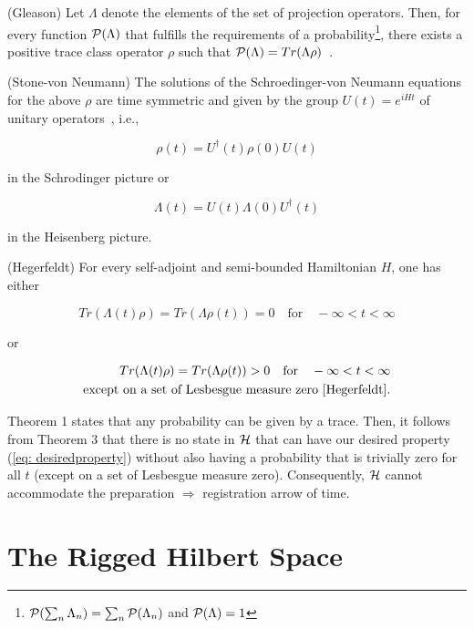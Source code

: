 \documentclass[12pt]{article}
\begin{document}
 (Gleason) Let $\Lambda$ denote the elements of the set of projection operators.  Then, for every function ${\cal P}(\Lambda)$ that fulfills the requirements of a probability\footnote{${\cal P}(\sum_n \Lambda_n) = \sum_n {\cal P}(\Lambda_n)$ and ${\cal P}(\Lambda) = 1$}, there exists a positive trace class operator $\rho$ such that ${\cal P}(\Lambda) = Tr(\Lambda \rho)$~\cite{Gleason}.

 (Stone-von Neumann) The solutions of the Schroedinger-von Neumann equations for the above $\rho$ are time symmetric and given by the group $U(t) = e^{iHt}$ of unitary operators~\cite{Stone-von.Neumann}, i.e., 

\begin{equation}
\rho(t) = U^{\dagger}(t) \rho(0) U(t)
\end{equation}

\noindent in the Schrodinger picture or

\begin{equation}
\Lambda(t) = U(t) \Lambda(0) U^{\dagger}(t)
\end{equation}

\noindent in the Heisenberg picture.

 (Hegerfeldt) For every self-adjoint and semi-bounded Hamiltonian $H$, one has either

\begin{equation}
Tr(\Lambda(t) \rho) = Tr(\Lambda \rho(t)) = 0 \,\,\,\,\,\, \mbox{for} \,\,\,\,\,\, -\infty < t < \infty
\end{equation}

\noindent or

\begin{eqnarray}
Tr(\Lambda(t) \rho) = Tr(\Lambda \rho(t)) > 0 \,\,\,\,\,\, \mbox{for} \,\,\,\,\,\, -\infty < t < \infty   \nonumber  \\
	 \mbox{except on a set of Lesbesgue measure zero~\cite{Hegerfeldt}.}
\end{eqnarray}

Theorem 1 states that any probability can be given by a trace.  Then, it follows from Theorem 3 that there is no state in ${\cal H}$ that can have our desired property (\ref{eq: desiredproperty}) without also having a probability that is trivially zero for all $t$ (except on a set of Lesbesgue measure zero).  Consequently, ${\cal H}$ cannot accommodate the preparation $\Rightarrow$ registration arrow of time.

\section{The Rigged Hilbert Space}
\end{document}
